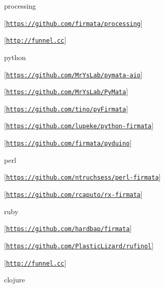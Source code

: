 \begin{DoxyItemize}
\item processing
\begin{DoxyItemize}
\item \mbox{[}\href{https://github.com/firmata/processing}{\tt https\+://github.\+com/firmata/processing}\mbox{]}
\item \mbox{[}\href{http://funnel.cc}{\tt http\+://funnel.\+cc}\mbox{]}
\end{DoxyItemize}
\item python
\begin{DoxyItemize}
\item \mbox{[}\href{https://github.com/MrYsLab/pymata-aio}{\tt https\+://github.\+com/\+Mr\+Ys\+Lab/pymata-\/aio}\mbox{]}
\item \mbox{[}\href{https://github.com/MrYsLab/PyMata}{\tt https\+://github.\+com/\+Mr\+Ys\+Lab/\+Py\+Mata}\mbox{]}
\item \mbox{[}\href{https://github.com/tino/pyFirmata}{\tt https\+://github.\+com/tino/py\+Firmata}\mbox{]}
\item \mbox{[}\href{https://github.com/lupeke/python-firmata}{\tt https\+://github.\+com/lupeke/python-\/firmata}\mbox{]}
\item \mbox{[}\href{https://github.com/firmata/pyduino}{\tt https\+://github.\+com/firmata/pyduino}\mbox{]}
\end{DoxyItemize}
\item perl
\begin{DoxyItemize}
\item \mbox{[}\href{https://github.com/ntruchsess/perl-firmata}{\tt https\+://github.\+com/ntruchsess/perl-\/firmata}\mbox{]}
\item \mbox{[}\href{https://github.com/rcaputo/rx-firmata}{\tt https\+://github.\+com/rcaputo/rx-\/firmata}\mbox{]}
\end{DoxyItemize}
\item ruby
\begin{DoxyItemize}
\item \mbox{[}\href{https://github.com/hardbap/firmata}{\tt https\+://github.\+com/hardbap/firmata}\mbox{]}
\item \mbox{[}\href{https://github.com/PlasticLizard/rufinol}{\tt https\+://github.\+com/\+Plastic\+Lizard/rufinol}\mbox{]}
\item \mbox{[}\href{http://funnel.cc}{\tt http\+://funnel.\+cc}\mbox{]}
\end{DoxyItemize}
\item clojure
\begin{DoxyItemize}

\end{DoxyItemize}
\end{DoxyItemize}
